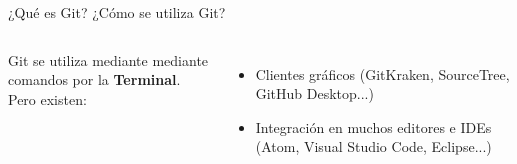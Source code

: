 \begin{frame}{¿Qué es Git?}
  \alert{\Large ¿Cómo se utiliza Git?}
  \begin{columns}[onlytextwidth]
    Git se utiliza mediante mediante comandos por la \textbf{Terminal}. \\

    Pero existen:
    \begin{itemize}
      \item Clientes gráficos (GitKraken, SourceTree, GitHub Desktop...)
      \item Integración en muchos editores e IDEs (Atom, Visual Studio Code, Eclipse...)
    \end{itemize}
    \vspace{0.5cm}
  \end{columns}
\end{frame}
